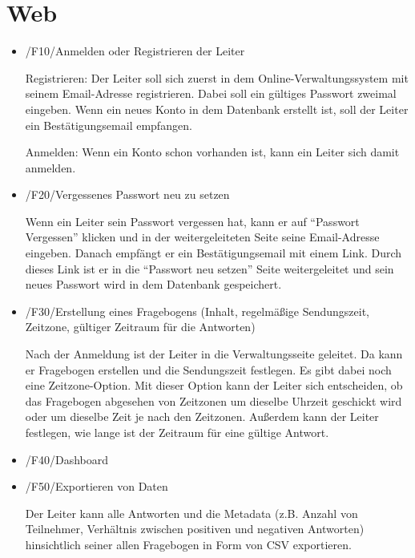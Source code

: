 \documentclass[a4paper]{scrreprt}
\begin{document}
		\section{Web}
	        \begin{itemize}
	            \item /F10/Anmelden oder Registrieren der Leiter
		            \par Registrieren: Der Leiter soll sich zuerst in dem Online-Verwaltungssystem mit seinem Email-Adresse registrieren. Dabei soll ein gültiges Passwort zweimal eingeben. Wenn ein neues Konto in dem Datenbank erstellt ist, soll der Leiter ein Bestätigungsemail empfangen.
		            
	            	\par Anmelden: Wenn ein Konto schon vorhanden ist, kann ein Leiter sich damit anmelden.
	            	
	            \item /F20/Vergessenes Passwort neu zu setzen
	            	\par Wenn ein Leiter sein Passwort vergessen hat, kann er auf “Passwort Vergessen” klicken und in der weitergeleiteten Seite seine Email-Adresse eingeben. Danach empfängt er ein Bestätigungsemail mit einem Link. Durch dieses Link ist er in die “Passwort neu setzen” Seite weitergeleitet und sein neues Passwort wird in dem Datenbank gespeichert.

	            \item /F30/Erstellung eines Fragebogens (Inhalt, regelmäßige Sendungszeit, Zeitzone, gültiger Zeitraum für die Antworten)
	            	\par Nach der Anmeldung ist der Leiter in die Verwaltungsseite geleitet. Da kann er Fragebogen erstellen und die Sendungszeit festlegen. Es gibt dabei noch eine Zeitzone-Option. Mit dieser Option kann der Leiter sich entscheiden, ob das Fragebogen abgesehen von Zeitzonen um dieselbe Uhrzeit geschickt wird oder um dieselbe Zeit je nach den Zeitzonen. Außerdem kann der Leiter festlegen, wie lange ist der Zeitraum für eine gültige Antwort.
	            	
	            \item /F40/Dashboard
	            	\par 
	            	
	            \item /F50/Exportieren von Daten
		         	\par Der Leiter kann alle Antworten und die Metadata (z.B. Anzahl von Teilnehmer, Verhältnis zwischen positiven und negativen Antworten) hinsichtlich seiner allen Fragebogen in Form von CSV exportieren.

			\end{itemize}
    
\end{document}
